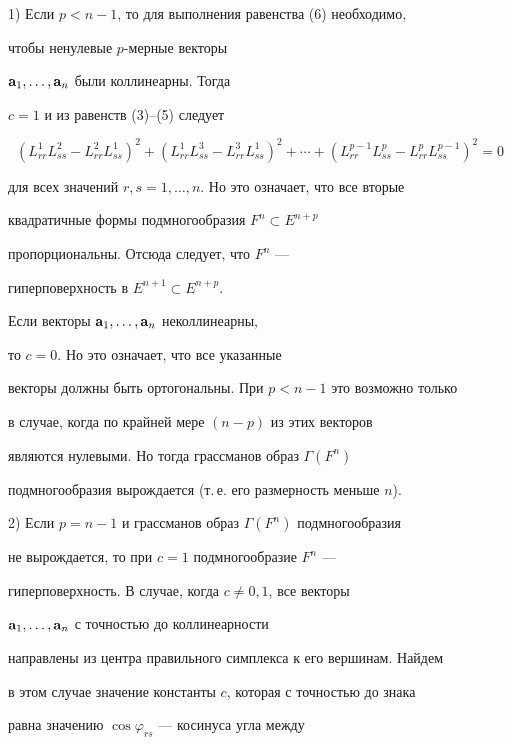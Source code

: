 \begin{pf}
1) Если $p<n-1$, то для выполнения равенства (6) необходимо, 


чтобы ненулевые $p$-мерные векторы


$\bold a_{1},\dotsc,\bold a_{n}$ были коллинеарны. Тогда 


$c=1$ и из равенств (3)--(5) следует


$$


(L_{rr}^{1}L_{ss}^{2}-L_{rr}^{2}L_{ss}^{1})^{2}+


(L_{rr}^{1}L_{ss}^{3}-L_{rr}^{3}L_{ss}^{1})^{2}+\dotsb


+(L_{rr}^{p-1}L_{ss}^{p}-L_{rr}^{p} L_{ss}^{p-1})^{2}=0


$$


для всех значений $r,s=1,\dotsc,n$. Но это означает, что все вторые


квадратичные формы подмногообразия $F^{n}\subset E^{n+p}$


пропорциональны. Отсюда следует, что $F^{n}$ ---


гиперповерхность в $E^{n+1}\subset E^{n+p}$.





Если векторы $\bold a_{1},\dotsc,\bold a_{n}$ неколлинеарны,


то $c=0$. Но это означает, что все указанные


векторы должны быть ортогональны. При $p<n-1$ это возможно только


в случае, когда по крайней мере $(n-p)$ из этих векторов


являются нулевыми. Но тогда грассманов образ $\Gamma(F^{n})$


подмногообразия вырождается (т.\,е. его размерность меньше $n$).





2) Если $p=n-1$ и грассманов образ $\Gamma(F^{n})$ подмногообразия


не вырождается, то при $c=1$ подмногообразие $F^{n}$ ---


гиперповерхность. В случае, когда $c\neq 0,1$, все векторы


$\bold a_{1},\dotsc,\bold a_{n}$ с точностью до коллинеарности


направлены из центра правильного симплекса к его вершинам. Найдем


в этом случае значение константы $c$, которая с точностью до знака


равна значению $\cos\varphi_{rs}$ --- косинуса угла между



\end{pf}
